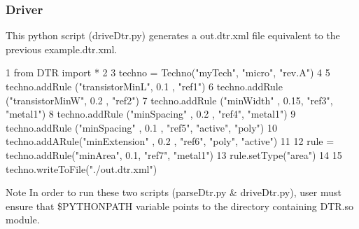 \hypertarget{dtr_dtrDrivePython}{}\subsubsection{Driver}\label{dtr_dtrDrivePython}
This python script ({\ttfamily drive\-Dtr.\-py}) generates a out.\-dtr.\-xml file equivalent to the previous example.\-dtr.\-xml. 
\begin{DoxyCodeInclude}
1 \textcolor{keyword}{from} DTR \textcolor{keyword}{import} *
2 
3 techno = Techno(\textcolor{stringliteral}{"myTech"}, \textcolor{stringliteral}{"micro"}, \textcolor{stringliteral}{"rev.A"})
4 
5 techno.addRule (\textcolor{stringliteral}{"transistorMinL"}, 0.1 , \textcolor{stringliteral}{"ref1"})
6 techno.addRule (\textcolor{stringliteral}{"transistorMinW"}, 0.2 , \textcolor{stringliteral}{"ref2"})
7 techno.addRule (\textcolor{stringliteral}{"minWidth"}      , 0.15, \textcolor{stringliteral}{"ref3"}, \textcolor{stringliteral}{"metal1"})
8 techno.addRule (\textcolor{stringliteral}{"minSpacing"}    , 0.2 , \textcolor{stringliteral}{"ref4"}, \textcolor{stringliteral}{"metal1"})
9 techno.addRule (\textcolor{stringliteral}{"minSpacing"}    , 0.1 , \textcolor{stringliteral}{"ref5"}, \textcolor{stringliteral}{"active"}, \textcolor{stringliteral}{"poly"})
10 techno.addARule(\textcolor{stringliteral}{"minExtension"}  , 0.2 , \textcolor{stringliteral}{"ref6"}, \textcolor{stringliteral}{"poly"}, \textcolor{stringliteral}{"active"})
11 
12 rule = techno.addRule(\textcolor{stringliteral}{"minArea"}, 0.1, \textcolor{stringliteral}{"ref7"}, \textcolor{stringliteral}{"metal1"})
13 rule.setType(\textcolor{stringliteral}{"area"})
14 
15 techno.writeToFile(\textcolor{stringliteral}{"./out.dtr.xml"})
\end{DoxyCodeInclude}


\begin{DoxyNote}{Note}
In order to run these two scripts ({\ttfamily parse\-Dtr.\-py} \& drive\-Dtr.\-py), user must ensure that \$\-P\-Y\-T\-H\-O\-N\-P\-A\-T\-H variable points to the directory containing D\-T\-R.\-so module. 
\end{DoxyNote}
